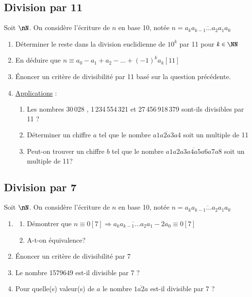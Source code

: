 \documentclass[oneside,12pt]{article}          %
\begin{document}
\subsection{Division par 11}
Soit $\nN$. On considère l'écriture de $n$ en base 10, notée $n=\overline{a_ka_{k-1}\ldots a_2a_1a_0}$
\begin{enumerate}
    \item Déterminer le reste dans la division euclidienne de $10^k$ par 11 pour $k\in\NN$
    \item En déduire que $n\equiv a_0-a_1+a_2-\ldots+(-1)^ka_k [11]$
    \item Énoncer un critère de divisibilité par 11 basé sur la question précédente.
    \item \underline{Applications} :
    \begin{enumerate}
    	\item Les nombres 30\,028 , 1\,234\,554\,321 et 27\,456\,918\,379 sont-ils divisibles par 11 ?
    	\item Déterminer un chiffre $a$ tel que le nombre $\overline{a1a2a3a4}$ soit un multiple de 11
    	\item Peut-on trouver un chiffre $b$ tel que le nombre $\overline{a1a2a3a4a5a6a7a8}$ soit un multiple de 11?
	\end{enumerate}     
\end{enumerate}



\subsection{Division par 7}
Soit $\nN$. On considère l'écriture de $n$ en base 10, notée $n=\overline{a_ka_{k-1}\ldots a_2a_1a_0}$
\begin{enumerate}
	\item \begin{enumerate}
		\item Démontrer que $n\equiv 0[7] \Longrightarrow \overline{a_ka_{k-1}\ldots a_2a_1}-2a_0\equiv0[7]$
		\item A-t-on équivalence?
\end{enumerate}	 
	\item Énoncer un critère de divisibilité par 7
	\item Le nombre 1579649 est-il divisible par 7 ?
	\item Pour quelle(s) valeur(s) de $a$ le nombre $\overline{1a2a}$ est-il divisible par 7 ?
\end{enumerate}
\end{document}
